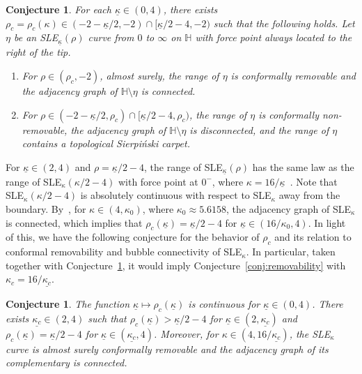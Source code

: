 \documentclass[a4paper]{article}
\numberwithin{equation}{section}
\newtheorem{conjecture}[theorem]{Conjecture}
\numberwithin{equation}{section}
\renewcommand{\1}{\mathbf{1}}
\begin{document}
\begin{conjecture}\label{conj:exotic-1}
    For each $\underline{\kappa} \in (0,4)$, there exists $\rho_c = \rho_c(\kappa) \in (-2-\underline{\kappa}/2,-2) \cap [\underline{\kappa}/2-4,-2) $ such that the following holds. Let $\eta$ be an SLE$_{\underline{\kappa}}(\rho)$ curve from $0$ to $\infty$ on $\mathbb{H}$ with force point always located to the right of the tip.
    \begin{enumerate}
        \item For $\rho \in (\rho_c, -2)$, almost surely, the range of $\eta$ is conformally removable and the adjacency graph of $\mathbb{H} \setminus \eta$ is connected.

        \item For $\rho \in (-2-\underline{\kappa}/2,\rho_c) \cap [\underline{\kappa}/2-4,\rho_c)$, the range of $\eta$ is conformally non-removable, the adjacency graph of $\mathbb{H} \setminus \eta$ is disconnected, and the range of $\eta$ contains a topological Sierpi\'nski carpet.
    \end{enumerate}
\end{conjecture}

For $\underline{\kappa} \in (2,4)$ and $\rho = \underline{\kappa}/2 - 4$, the range of SLE$_{\underline{\kappa}}(\rho)$ has the same law as the range of SLE$_{\kappa}(\kappa/2-4)$ with force point at $0^-$, where $\kappa=16/\underline{\kappa}$~\cite{MS-light-cone}. Note that SLE$_{\kappa}(\kappa/2-4)$ is absolutely continuous with respect to SLE$_{\kappa}$ away from the boundary. By~\cite{GP20-connectivity}, for $\kappa \in (4, \kappa_0)$, where $\kappa_0 \approx 5.6158$, the adjacency graph of SLE$_\kappa$ is connected, which implies that $\rho_c(\underline{\kappa}) = \underline{\kappa}/2-4$ for $\underline{\kappa} \in (16/\kappa_0, 4)$. In light of this, we have the following conjecture for the behavior of $\rho_c$ and its relation to conformal removability and bubble connectivity of SLE$_\kappa$. In particular, taken together with Conjecture~\ref{conj:exotic-1}, it would imply Conjecture~\ref{conj:removability} with $\kappa_c = 16/\underline{\kappa_c}$.

\begin{conjecture}\label{conj:exotic-2}
    The function $\underline{\kappa} \mapsto \rho_c(\underline{\kappa})$ is continuous for $\underline{\kappa} \in (0,4)$. There exists $\underline{\kappa_c} \in (2,4)$ such that $\rho_c(\underline{\kappa}) > \underline{\kappa}/2 - 4$ for $\underline{\kappa} \in (2, \underline{\kappa_c})$ and $\rho_c(\underline{\kappa}) = \underline{\kappa}/2 - 4$ for $\underline{\kappa} \in (\underline{\kappa_c}, 4)$. Moreover, for $\kappa \in (4, 16/ \underline{\kappa_c})$, the SLE$_{\kappa}$ curve is almost surely conformally removable and the adjacency graph of its complementary is connected.
\end{conjecture}
\end{document}
